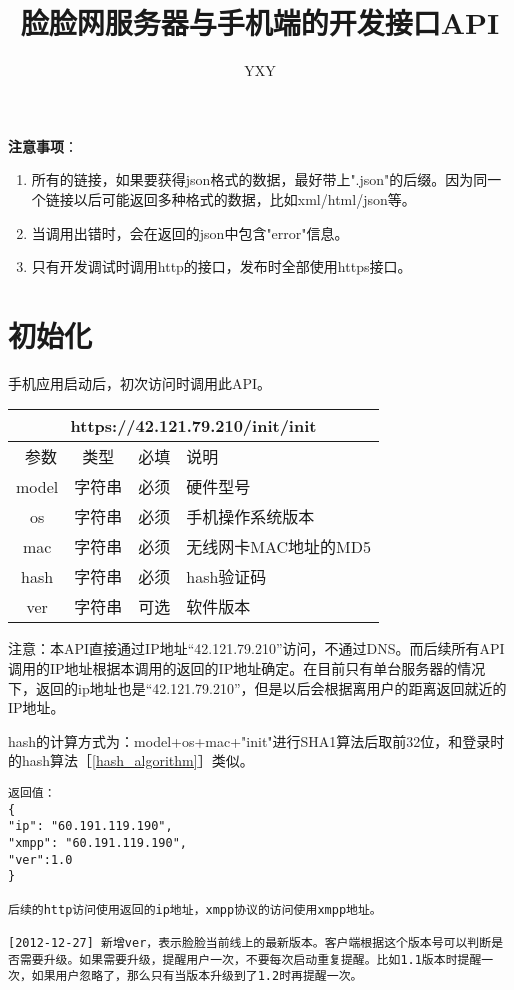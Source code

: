 \documentclass[cs4size]{ctexartutf8}
\author{YXY}
\title{脸脸网服务器与手机端的开发接口API}
\begin{document}
 
\maketitle
\tableofcontents

\newpage

\textbf{注意事项}：
\begin{enumerate}
\item 所有的链接，如果要获得json格式的数据，最好带上".json"的后缀。因为同一个链接以后可能返回多种格式的数据，比如xml/html/json等。
\item 当调用出错时，会在返回的json中包含"error"信息。
\item 只有开发调试时调用http的接口，发布时全部使用https接口。
\end{enumerate}

\newpage

\section{初始化}
手机应用启动后，初次访问时调用此API。
\begin{table}[H]
   \begin{center}
\begin{tabular}{|c|c|c|p{12cm}|}
\hline
\multicolumn{4}{|c|}{https://42.121.79.210/init/init} \\
\hline\hline
 \  参数  & 类型 & 必填 &  说明  \\
 \hline
 model  & 字符串 & 必须 &  硬件型号\\
\hline
 os  & 字符串 & 必须 &  手机操作系统版本\\
 \hline
 mac  & 字符串 & 必须 &  无线网卡MAC地址的MD5\\
 \hline
 hash  & 字符串 & 必须 &  hash验证码\\
  \hline
 ver  & 字符串 & 可选 &  软件版本\\
\hline
\end{tabular}
   \end{center}
\end{table}

注意：本API直接通过IP地址“42.121.79.210”访问，不通过DNS。而后续所有API调用的IP地址根据本调用的返回的IP地址确定。在目前只有单台服务器的情况下，返回的ip地址也是“42.121.79.210”，但是以后会根据离用户的距离返回就近的IP地址。


hash的计算方式为：model+os+mac+"init"进行SHA1算法后取前32位，和登录时的hash算法［\ref{hash_algorithm}］类似。

\begin{verbatim}
返回值：
{
"ip": "60.191.119.190",
"xmpp": "60.191.119.190",
"ver":1.0
}

后续的http访问使用返回的ip地址，xmpp协议的访问使用xmpp地址。

[2012-12-27] 新增ver，表示脸脸当前线上的最新版本。客户端根据这个版本号可以判断是否需要升级。如果需要升级，提醒用户一次，不要每次启动重复提醒。比如1.1版本时提醒一次，如果用户忽略了，那么只有当版本升级到了1.2时再提醒一次。

\end{verbatim}
\end{document}
